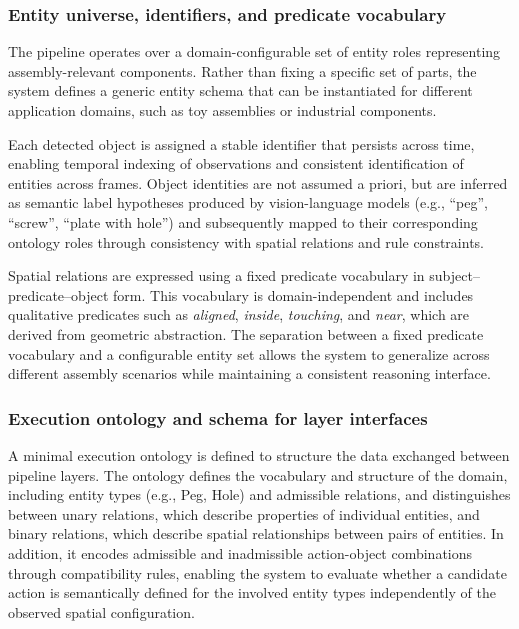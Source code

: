 \documentclass[11pt,titlepage,openright]{book}
\begin{document}
\subsubsection{Entity universe, identifiers, and predicate vocabulary}
\label{sec:entities-vocabulary}
The pipeline operates over a domain-configurable set of entity roles representing assembly-relevant components. Rather than fixing a specific set of parts, the system defines a generic entity schema that can be instantiated for different application domains, such as toy assemblies or industrial components.

Each detected object is assigned a stable identifier that persists across time, enabling temporal indexing of observations and consistent identification of entities across frames. Object identities are not assumed a priori, but are inferred as semantic label hypotheses produced by vision-language models (e.g., ``peg'', ``screw'', ``plate with hole'') and subsequently mapped to their corresponding ontology roles through consistency with spatial relations and rule constraints.

Spatial relations are expressed using a fixed predicate vocabulary in subject--predicate--object form. This vocabulary is domain-independent and includes qualitative predicates such as \textit{aligned}, \textit{inside}, \textit{touching}, and \textit{near}, which are derived from geometric abstraction. The separation between a fixed predicate vocabulary and a configurable entity set allows the system to generalize across different assembly scenarios while maintaining a consistent reasoning interface.


\subsubsection{Execution ontology and schema for layer interfaces}
\label{sec:ontology-schemas}

A minimal execution ontology is defined to structure the data exchanged between pipeline layers. The ontology defines the vocabulary and structure of the domain, including entity types (e.g., Peg, Hole) and admissible relations, and distinguishes between unary relations, which describe properties of individual entities, and binary relations, which describe spatial relationships between pairs of entities. In addition, it encodes admissible and inadmissible action-object combinations through compatibility rules, enabling the system to evaluate whether a candidate action is semantically defined for the involved entity types independently of the observed spatial configuration.
\end{document}
